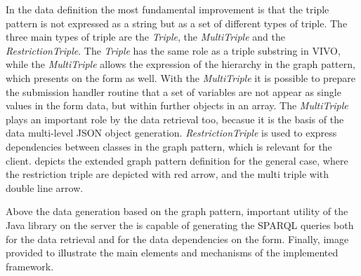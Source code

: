 In the data definition the most fundamental improvement is that the triple pattern is not expressed as a string but as a set of different types of triple. The three main types of triple are the \textit{Triple}, the \textit{MultiTriple} and the \textit{RestrictionTriple}. The \textit{Triple} has the same role as a triple substring in VIVO, while the \textit{MultiTriple} allows the expression of the hierarchy in the graph pattern, which presents on the form as well. With the \textit{MultiTriple} it is possible to prepare the submission handler routine that a set of variables are not appear as single values in the form data, but within further objects in an array. The \textit{MultiTriple} plays an important role by the data retrieval too, becasue it is the basis of the data multi-level JSON object generation. \textit{RestrictionTriple} is used to express dependencies between classes in the graph pattern, which is relevant for the client.  depicts the extended graph pattern definition for the general case, where the restriction triple are depicted with red arrow, and the multi triple with double line arrow.


Above the data generation based on the graph pattern, important utility of the Java library on the server the is capable of generating the SPARQL queries both for the data retrieval and for the data dependencies on the form. Finally, image provided to illustrate the main elements and mechanisms of the implemented framework.

